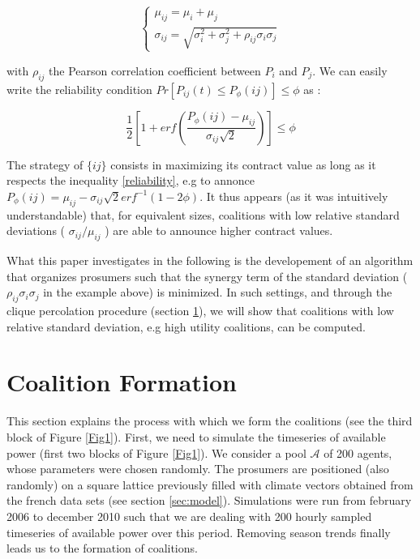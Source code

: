 \documentclass[conference]{IEEEtran}
\begin{document}
\begin{equation}
\left\{ \begin{array}{lll}
		\mu_{ij} = \mu_{i} + \mu_{j} \\
		\sigma_{ij} = \sqrt{\sigma_{i}^{2} + \sigma_{j}^{2} + \rho_{ij}\sigma_{i}\sigma_{j}}
\end{array} \right.
\label{parameters}
\end{equation}

with $ \rho_{ij} $ the Pearson correlation coefficient between $ P_{i} $ and $ P_{j} $. We can easily write the reliability condition $ Pr[P_{ij}(t) \leq P_{\phi}(ij) ] \leq \phi $ as :

\begin{equation}
\dfrac{1}{2} \left[ 1+ erf \left( \dfrac{P_{\phi}(ij) - \mu_{ij}}{\sigma_{ij}\sqrt{2}} \right) \right] \leq \phi
\label{reliability}
\end{equation}

The strategy of $ \{ij\} $ consists in maximizing its contract value as long as it respects the inequality \ref{reliability}, e.g to annonce $ P_{\phi}(ij) = \mu_{ij} - \sigma_{ij}\sqrt{2}erf^{-1}(1-2 \phi ) $. It thus appears (as it was intuitively understandable) that, for equivalent sizes, coalitions with low relative standard deviations ( $ \sigma_{ij} / \mu_{ij} $ ) are able to announce higher contract values. 

What this paper investigates in the following is the developement of an algorithm that organizes prosumers such that the synergy term of the standard deviation ( $ \rho_{ij}\sigma_{i}\sigma_{j} $ in the example above) is minimized. In such settings, and through the clique percolation procedure (section \ref{sec:forming}), we will show that coalitions with low relative standard deviation, e.g high utility coalitions, can be computed.


%
%

\section{Coalition Formation}
\label{sec:forming}

This section explains the process with which we form the coalitions (see the third block of Figure \ref{Fig1}). First, we need to simulate the timeseries of available power (first two blocks of Figure \ref{Fig1}). We consider a pool $ \mathcal{A} $ of 200 agents, whose parameters were chosen randomly. The prosumers are positioned (also randomly) on a square lattice previously filled with climate vectors obtained from the french data sets (see section \ref{sec:model}). Simulations were run from february 2006 to december 2010 such that we are dealing with 200 hourly sampled timeseries of available power over this period. Removing season trends finally leads us to the formation of coalitions. 
\end{document}

